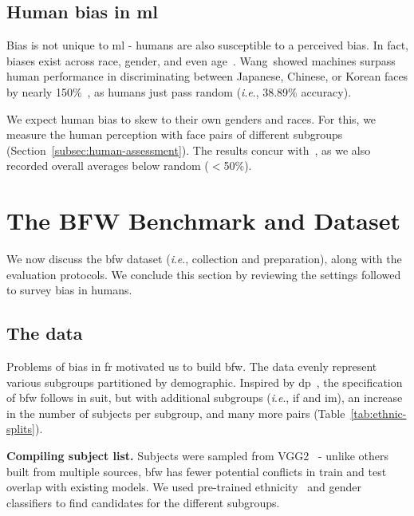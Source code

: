 \documentclass[10pt,twocolumn,letterpaper]{article}
\newcommand{\ie}{\textit{i}.\textit{e}., }
\begin{document}
\subsection{Human bias in \gls{ml}}
Bias is not unique to \gls{ml} - humans are also susceptible to a perceived bias. In fact, biases exist across race, gender, and even age~\cite{10.1007/978-3-030-13469-3_68, bar2006, meissner2001, nicholls2018}. Wang~\etal showed machines surpass human performance in discriminating between Japanese, Chinese, or Korean faces by nearly 150\%~\cite{wang2018they}, as humans just pass random (\ie 38.89\% accuracy).

We expect human bias to skew to their own genders and races. For this, we measure the human perception with face pairs of different subgroups (Section~\ref{subsec:human-assessment}). The results concur with~\cite{wang2018they}, as we also recorded overall averages below random ($<$50\%). %



\section{The BFW Benchmark and Dataset}


We now discuss the \gls{bfw} dataset (\ie collection and preparation), along with the evaluation protocols. We conclude this section by reviewing the settings followed to survey bias in humans.

\subsection{The data}
Problems of bias in \gls{fr} motivated us to build \gls{bfw}. The data evenly represent various subgroups partitioned by demographic. Inspired by \gls{dp}~\cite{demogPairs}, the specification of \gls{bfw} follows in suit, but with additional subgroups (\ie \gls{if} and \gls{im}), an increase in the number of subjects per subgroup, and many more pairs (Table~\ref{tab:ethnic-splits}). 




\vspace{1mm}
\noindent\textbf{Compiling subject list.} 
Subjects were sampled from VGG2~\cite{Cao18} - unlike others built from multiple sources, \gls{bfw} has fewer potential conflicts in train and test overlap with existing models. We used pre-trained ethnicity~\cite{ambekar2009name} and gender~\cite{levi2015age} classifiers to find candidates for the different subgroups.
\end{document}
